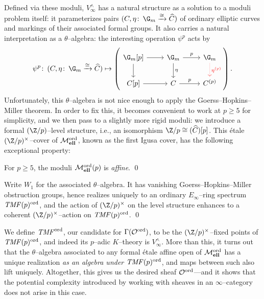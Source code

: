 \noindent Defined via these moduli, $V^\wedge_\infty$ has a natural structure as a solution to a moduli problem itself: it parameterizes pairs $(C, \eta\co \G_m \xrightarrow{\cong} \widehat C)$ of ordinary elliptic curves and markings of their associated formal groups.  It also carries a natural interpretation as a $\theta$--algebra: the interesting operation $\psi^p$ acts by
\[
\psi^p\co (C, \eta\co \G_m \xrightarrow\cong \widehat C) \mapsto \left(
\begin{tikzcd}
\G_m[p] \arrow{r} \arrow{d} & \G_m \arrow["p"]{r} \arrow["\eta"]{d} & \G_m \arrow[densely dotted, red, "\eta^{(p)}"]{d} \\
C[p]\arrow{r} & C \arrow["p"]{r} & C^{(p)}
\end{tikzcd}
\right).
\]
Unfortunately, this $\theta$--algebra is not nice enough to apply the Goerss--Hopkins--Miller theorem.  In order to fix this, it becomes convenient to work at $p \ge 5$ for simplicity, and we then pass to a slightly more rigid moduli: we introduce a formal $(\Z/p)$--level structure, i.e., an isomorphism $\Z/p \cong (\widehat C)[p]$.  This \'etale $(\Z/p)^\times$--cover of $\mathcal{M}_{\mathbf{ell}}^{\mathrm{ord}}$, known as the first Igusa cover, has the following exceptional property:

\begin{lemma}
For $p \ge 5$, the moduli $\mathcal{M}_{\mathbf{ell}}^{\mathrm{ord}}(p)$ is \emph{affine}. \qed
\end{lemma}

\begin{corollary}
Write $W_1$ for the associated $\theta$--algebra.  It has vanishing Goerss--Hopkins--Miller obstruction groups, hence realizes uniquely to an ordinary $E_\infty$--ring spectrum $\mathit{TMF}(p)^{\mathrm{ord}}$, and the action of $(\Z/p)^\times$ on the level structure enhances to a coherent $(\Z/p)^\times$--action on $\mathit{TMF}(p)^{\mathrm{ord}}$. \qed
\end{corollary}

We define $\mathit{TMF}^{\mathrm{ord}}$, our candidate for $\Gamma(\mathcal{O}^{\mathrm{ord}})$, to be the $(\Z/p)^\times$--fixed points of $\mathit{TMF}(p)^{\mathrm{ord}}$, and indeed its $p$--adic $K$--theory is $V^\wedge_\infty$.  More than this, it turns out that the $\theta$--algebra associated to any formal \'etale affine open of $\mathcal{M}_{\mathbf{ell}}^{\mathrm{ord}}$ has a unique realization \emph{as an algebra under $\mathit{TMF}(p)^{\mathrm{ord}}$}, and maps between such also lift uniquely.  Altogether, this gives us the desired sheaf $\mathcal{O}^{\mathrm{ord}}$---and it shows that the potential complexity introduced by working with sheaves in an $\infty$--category does not arise in this case.

